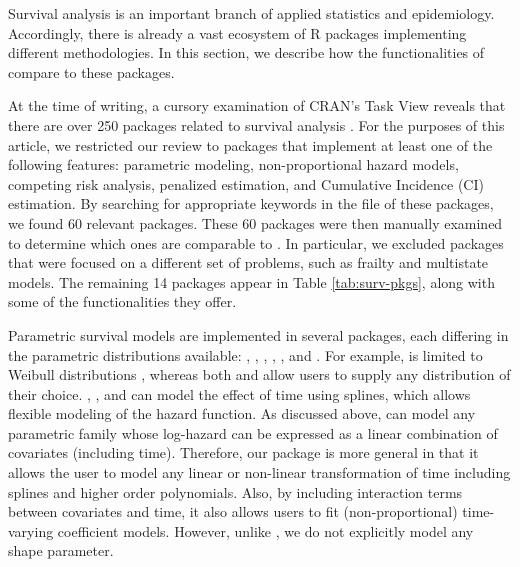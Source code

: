 Survival analysis is an important branch of applied statistics and
epidemiology. Accordingly, there is already a vast ecosystem of R
packages implementing different methodologies. In this section, we
describe how the functionalities of  compare to these
packages.

At the time of writing, a cursory examination of CRAN's 
Task View reveals that there are over 250 packages related to survival
analysis \citep{survTaskView}. For the purposes of this article, we
restricted our review to packages that implement at least one of the
following features: parametric modeling, non-proportional hazard models,
competing risk analysis, penalized estimation, and Cumulative Incidence
(CI) estimation. By searching for appropriate keywords in the
 file of these packages, we found 60 relevant
packages. These 60 packages were then manually examined to determine
which ones are comparable to . In particular, we excluded
packages that were focused on a different set of problems, such as
frailty and multistate models. The remaining 14 packages appear in Table
\ref{tab:surv-pkgs}, along with some of the functionalities they offer.

Parametric survival models are implemented in several packages, each
differing in the parametric distributions available: 
\citeyearpar{mahani2015bayesian}, 
\citeyearpar{flexsurv}, 
\citeyearpar{smoothHazard},  \citeyearpar{clements_liu},
 \citeyearpar{scheike2014estimating}, and
 \citeyearpar{survival-package}. For example,
 is limited to Weibull distributions
\citeyearpar{smoothHazard}, whereas both  and
 allow users to supply any distribution of their choice.
, ,  and  can
model the effect of time using splines, which allows flexible modeling
of the hazard function. As discussed above,  can model any
parametric family whose log-hazard can be expressed as a linear
combination of covariates (including time). Therefore, our package is
more general in that it allows the user to model any linear or
non-linear transformation of time including splines and higher order
polynomials. Also, by including interaction terms between covariates and
time, it also allows users to fit (non-proportional) time-varying
coefficient models. However, unlike , we do not explicitly
model any shape parameter.

